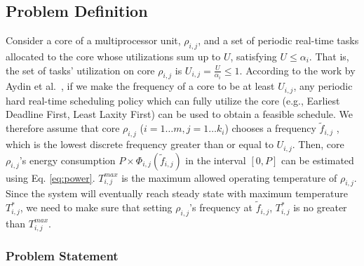 \documentclass[conference]{IEEEtran}
\newtheorem{proposition}{Proposition}
\begin{document}
\subsection{Problem Definition}
\label{sec:pd}

Consider a core of a multiprocessor unit, $\rho_{i,j}$, and a set of periodic real-time tasks allocated to the core whose utilizations sum up to $U$, satisfying $U \leq \alpha_i$. That is, the set of tasks' utilization on core $\rho_{i,j}$ is $U_{i,j} = \frac{U}{\alpha_i} \leq 1$.
%
%
According to the work by Aydin et al.~\cite{Aydin01}, if we make the frequency of a core to be at least $U_{i,j}$, any periodic hard real-time scheduling policy which can fully utilize the core (e.g., Earliest Deadline First, Least Laxity First) can be used to obtain a feasible schedule.
We therefore assume that core $\rho_{i,j}$ ($i=1 \ldots m, j=1 \ldots k_i$) chooses a frequency $\tilde{f}_{i,j}$ , which is the lowest discrete frequency  greater than or equal to $U_{i,j}$. Then, core $\rho_{i,j}$'s energy consumption  $P \times \Phi_{i,j}(\tilde{f}_{i,j})$ in the interval $[0,P]$ can be estimated using Eq. \ref{eq:power}.
$T^{max}_{i,j}$ is the maximum allowed operating temperature of $\rho_{i,j}$.
Since the system will eventually reach  steady state with maximum temperature $T^*_{i,j}$, we need to make sure that setting $\rho_{i,j}$'s frequency at $\tilde{f}_{i,j}$, $T^*_{i,j}$ is no greater than $T^{max}_{i,j}$.

\subsubsection{Problem Statement}
\end{document}

